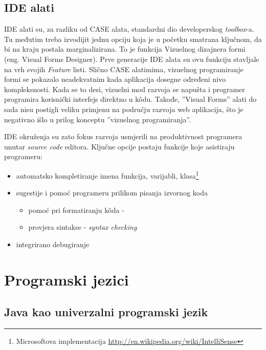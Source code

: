 \documentclass[times, utf8, seminar]{fit}
\begin{document}
\subsection{IDE alati}

IDE alati su, za razliku od CASE alata, standardni dio developerskog \emph{toolbox}-a. Tu međutim treba izvodijit jednu opciju koja je u početku smatrana ključnom, da bi na kraju postala marginalizirana. To je funkcija Vizuelnog dizajnera formi (eng. Visual Forms Designer). Prve generacije IDE alata su ovu funkciju stavljale na vrh svojih \emph{Feature} listi. Slično CASE alatimima,  vizuelnog programiranje formi se pokazalo neadekvatnim kada aplikacija dosegne određeni nivo kompleksnosti. Kada se to desi, vizuelni mod razvoja se napušta i programer programira korisnički interfejs direktno u k\^odu. Takođe, ''Visual Forms'' alati do sada nisu postigli veliku primjenu na području razvoja web aplikacija, što je negativno išlo u prilog konceptu ''vizuelnog programiranja''. 

IDE okruženja su zato fokus razvoja usmjerili na produktivnost programera unutar \emph{source code} editora. Ključne opcije postaju funkcije koje asistiraju programeru:
\begin{itemize}
  \item automatsko kompletiranje imena funkcija, varijabli, klasa\footnote{Microsoftova implementacija \url{http://en.wikipedia.org/wiki/IntelliSense}}
  \item sugestije i pomoć programeru prilikom pisanja izvornog koda 
     \begin{itemize}
        \item pomoć pri formatiranju k\^oda - 
        \item provjera sintakse - \emph{syntax checking}
      \end{itemize}
  \item integrirano debugiranje
\end{itemize}

\section{Programski jezici}

\subsection{Java kao univerzalni programski jezik}
\end{document}

